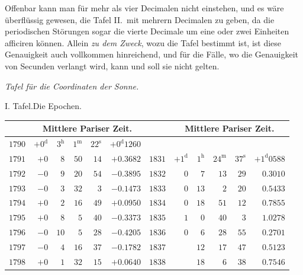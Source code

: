 Offenbar kann man für mehr als vier Decimalen nicht einstehen, und es wäre überflüssig gewesen, die Tafel II.\ mit mehrern Decimalen zu geben, da die periodischen Störungen sogar die vierte Decimale um eine oder zwei Einheiten afficiren können. Allein \emph{zu dem Zweck}, wozu die Tafel bestimmt ist, ist diese Genauigkeit auch vollkommen hinreichend, und für die Fälle, wo die Genauigkeit von Secunden verlangt wird, kann und soll sie nicht gelten.
\clearpage
\thispagestyle{empty}
\noindent{}%
\par\nobreak\smallskip
\newsavebox{\GaussVIEpochFrameBox}
\begin{lrbox}{\GaussVIEpochFrameBox}
\begin{minipage}{\dimexpr\linewidth-20pt\relax}
\centering
\vspace*{9pt}
{\large\itshape Tafel für die Coordinaten der Sonne.\par}
\medskip
{\large I. Tafel.\quad Die Epochen.\par}
\smallskip
\begingroup\fontsize{9}{10.2}\selectfont
\setlength{\tabcolsep}{3pt}
\begin{tabular}{r|rrrr|r||r|rrrr|r}
&\multicolumn{5}{c||}{Mittlere Pariser Zeit.}& &\multicolumn{5}{c}{Mittlere Pariser Zeit.}\\\hline
$1790$ & $+0^{\mathrm d}$ & $3^{\mathrm h}$ & $1^{\mathrm m}$ & $22^{\mathrm s}$ & $+0^{\mathrm d}1260$ &  &  &  &  &  & \\
$1791$ & $+0$ & $8$ & $50$ & $14$ & $+0.3682$ & $1831$ & $+1^{\mathrm d}$ & $1^{\mathrm h}$ & $24^{\mathrm m}$ & $37^{\mathrm s}$ & $+1^{\mathrm d}0588$\\
$1792$ & $-0$ & $9$ & $20$ & $54$ & $-0.3895$ & $1832$ & $0$ & $7$ & $13$ & $29$ & $0.3010$\\
$1793$ & $-0$ & $3$ & $32$ & $3$ & $-0.1473$ & $1833$ & $0$ & $13$ & $2$ & $20$ & $0.5433$\\
$1794$ & $+0$ & $2$ & $16$ & $49$ & $+0.0950$ & $1834$ & $0$ & $18$ & $51$ & $12$ & $0.7855$\\
$1795$ & $+0$ & $8$ & $5$ & $40$ & $-0.3373$ & $1835$ & $1$ & $0$ & $40$ & $3$ & $1.0278$\\[3pt]
$1796$ & $-0$ & $10$ & $5$ & $28$ & $-0.4205$ & $1836$ & $0$ & $6$ & $28$ & $55$ & $0.2701$\\
$1797$ & $-0$ & $4$ & $16$ & $37$ & $-0.1782$ & $1837$ &  & $12$ & $17$ & $47$ & $0.5123$\\
$1798$ & $+0$ & $1$ & $32$ & $15$ & $+0.0640$ & $1838$ &  & $18$ & $6$ & $38$ & $0.7546$\\

\end{tabular}
\end{minipage}
\end{lrbox}
